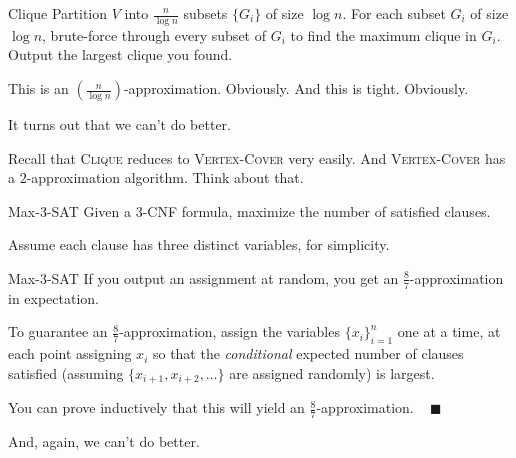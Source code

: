 \begin{solution}{Clique}
    Partition $V$ into $\frac{n}{\log n}$ subsets $\{G_i\}$ of size $\log n$.  For each subset $G_i$ of size $\log n$, brute-force through every subset of $G_i$ to find the maximum clique in $G_i$.  Output the largest clique you found.

    This is an $\left(\frac{n}{\log n}\right)$-approximation.  Obviously.  And this is tight.  Obviously.
\end{solution}

It turns out that we can't do better.

\begin{remark}
    Recall that \textsc{Clique} reduces to \textsc{Vertex-Cover} very easily.  And \textsc{Vertex-Cover} has a $2$-approximation algorithm.  Think about that.
\end{remark}

\begin{problem}{Max-3-SAT}
    Given a $3$-CNF formula, maximize the number of satisfied clauses.

    Assume each clause has three distinct variables, for simplicity.
\end{problem}

\begin{solution}{Max-3-SAT}
    If you output an assignment at random, you get an $\frac{8}{7}$-approximation in expectation.

    To guarantee an $\frac{8}{7}$-approximation, assign the variables $\{x_i\}_{i = 1}^n$ one at a time, at each point assigning $x_i$ so that the \emph{conditional} expected number of clauses satisfied (assuming $\{x_{i + 1}, x_{i + 2}, \dots\}$ are assigned randomly) is largest.

    You can prove inductively that this will yield an $\frac{8}{7}$-approximation. ~ $\blacksquare$
\end{solution}

And, again, we can't do better.

